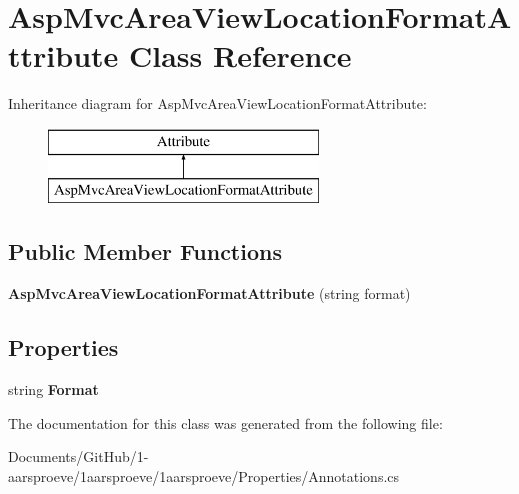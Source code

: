 \hypertarget{class_asp_mvc_area_view_location_format_attribute}{}\section{Asp\+Mvc\+Area\+View\+Location\+Format\+Attribute Class Reference}
\label{class_asp_mvc_area_view_location_format_attribute}
Inheritance diagram for Asp\+Mvc\+Area\+View\+Location\+Format\+Attribute\+:\begin{figure}[H]
\begin{center}
\leavevmode
\includegraphics[height=2.000000cm]{class_asp_mvc_area_view_location_format_attribute}
\end{center}
\end{figure}
\subsection*{Public Member Functions}
\begin{DoxyCompactItemize}
\item 
\hypertarget{class_asp_mvc_area_view_location_format_attribute_a27bac0c5e55099e7d35be1f54f361a44}{}{\bfseries Asp\+Mvc\+Area\+View\+Location\+Format\+Attribute} (string format)\label{class_asp_mvc_area_view_location_format_attribute_a27bac0c5e55099e7d35be1f54f361a44}

\end{DoxyCompactItemize}
\subsection*{Properties}
\begin{DoxyCompactItemize}
\item 
\hypertarget{class_asp_mvc_area_view_location_format_attribute_ac3d03e8d1371c427048f84046c327e0e}{}string {\bfseries Format}\label{class_asp_mvc_area_view_location_format_attribute_ac3d03e8d1371c427048f84046c327e0e}

\end{DoxyCompactItemize}


The documentation for this class was generated from the following file\+:\begin{DoxyCompactItemize}
\item 
Documents/\+Git\+Hub/1-\/aarsproeve/1aarsproeve/1aarsproeve/\+Properties/Annotations.\+cs\end{DoxyCompactItemize}
